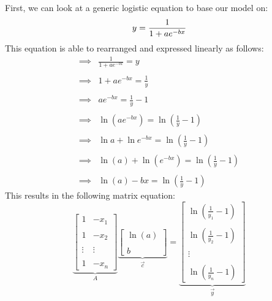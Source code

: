 \documentclass[12pt]{article}
\begin{document}
\noindent First, we can look at a generic logistic equation to base our model on:
\[
\displaystyle y=\frac{1}{1+ae^{-bx}} \\
\]
This equation is able to rearranged and expressed linearly as follows:
\[
\begin{array}{rl}
    \implies{} & \displaystyle\frac{1}{1+ae^{-bx}}=y \\ \\
    \implies{} & \displaystyle 1+ae^{-bx}=\frac{1}{y} \\ \\
    \implies{} & \displaystyle ae^{-bx}=\frac{1}{y}-1 \\ \\ 
    \implies{} & \ln{(ae^{-bx})}=\ln{(\frac{1}{y}-1)} \\ \\
    \implies{} & \ln{a}+\ln{e^{-bx}}=\ln{(\frac{1}{y}-1)} \\ \\
    \implies{} & \ln{(a)}+\ln{(e^{-bx})}=\ln{(\frac{1}{y}-1)} \\ \\
    \implies{} & \ln(a) - bx = \ln{(\frac{1}{y}-1)}
\end{array}
\]
This results in the following matrix equation:
\[ \underbrace{
\left[\begin{array}{cc}
1 & -x_{1} \\ \\
1 & -x_{2} \\ \\
\vdots & \vdots \\ \\
1 & -x_{n}
\end{array}\right]}_{\displaystyle A}
\underbrace{\left[\begin{array}{c}
\ln{(a)} \\ \\
b
\end{array}\right]}_{\displaystyle\vec{c}} = 
\underbrace{\left[\begin{array}{c}
\ln{(\frac{1}{y_{1}}-1)} \\ \\
\ln{(\frac{1}{y_{2}}-1)} \\ \\
\vdots \\ \\
\ln{(\frac{1}{y_{n}}-1)}
\end{array}\right]}_{\displaystyle\vec{y}}
\]

\pagebreak
\end{document}
